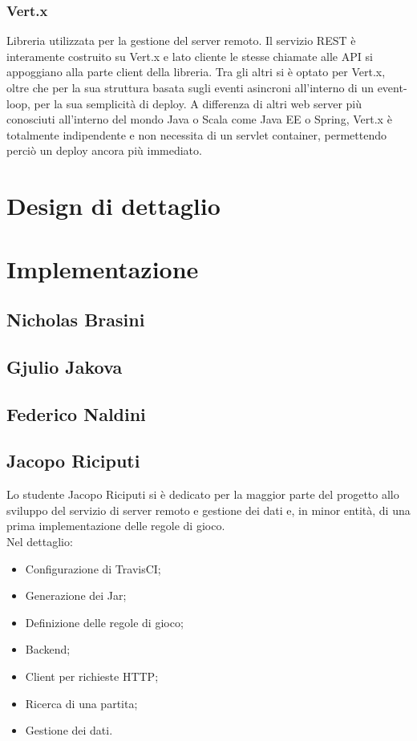 	 \subsubsection{Vert.x}\label{subsub:tecnologie:vert.x}
	  Libreria utilizzata per la gestione del server remoto. Il servizio REST è interamente costruito su Vert.x e lato cliente le stesse chiamate alle API si appoggiano alla parte client della libreria.
	  Tra gli altri si è optato per Vert.x, oltre che per la sua struttura basata sugli eventi asincroni all'interno di un event-loop, per la sua semplicità di deploy. A differenza di altri web server più conosciuti all'interno del mondo Java o Scala come Java EE o Spring, Vert.x è totalmente
	  indipendente e non necessita di un servlet container, permettendo perciò un deploy ancora più immediato.
        \clearpage
    \section{Design di dettaglio}\label{sec:design:details}
    
    \clearpage
    
    \section{Implementazione}\label{sec:implementation}
        \subsection{Nicholas Brasini}\label{subsec:brasini}
        \subsection{Gjulio Jakova}\label{subsec:jakova}
        \subsection{Federico Naldini}\label{subsec:naldini}
        \subsection{Jacopo Riciputi}\label{subsec:riciputi}
	  Lo studente Jacopo Riciputi si è dedicato per la maggior parte del progetto allo sviluppo del servizio di server remoto e gestione dei dati e, in minor entità, di una prima implementazione delle regole di gioco. 
	  \\
	  Nel dettaglio: 
	    \begin{itemize}
	     \item Configurazione di TravisCI;
	     \item Generazione dei Jar;
	     \item Definizione delle regole di gioco;
	     \item Backend;
	     \item Client per richieste HTTP;
	     \item Ricerca di una partita;
	     \item Gestione dei dati.
	    \end{itemize}
	    
